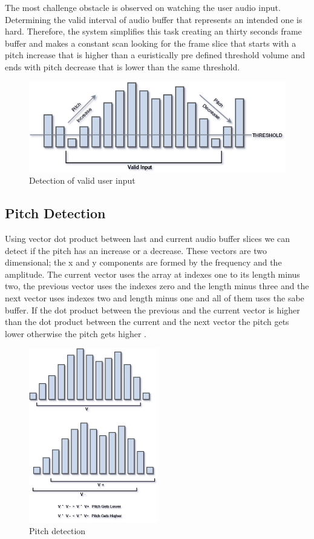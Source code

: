 \documentclass[
	article,			%
	11pt,				%
	oneside,			%
	a4paper,			%
	english,			%
	english,				%
	]{abntex2}
\begin{document}
The most challenge obstacle is observed on watching the user audio input. Determining the valid interval
of audio buffer that represents an intended one is hard. Therefore, the system simplifies this task
creating an thirty seconds frame buffer and makes a constant scan looking for the frame slice that
starts with a pitch increase that is higher than a euristically pre defined threshold volume and ends
with pitch decrease that is lower than the same threshold.

\begin{figure}[H]
    \caption[english]{Detection of valid user input}
    \centering
    \includegraphics[width=\textwidth]{AudioBufferFrameSlice}
\end{figure}

\subsection{Pitch Detection}

Using vector dot product between last and current audio buffer slices we can detect if the pitch has
an increase or a decrease. These vectors are two dimensional; the x and y components are formed by
the frequency and the amplitude. The current vector uses the array at indexes one to its length
minus two, the previous vector uses the indexes zero and the length minus three and the next vector 
uses indexes two and length minus one and all of them uses the sabe buffer. If the dot product between 
the previous and the current vector is higher than the dot product between the current and the next
vector the pitch gets lower otherwise the pitch gets higher \cite{nonverbalvoiceinput}.

\begin{figure}[H]
    \caption[english]{Pitch detection}
    \centering
    \includegraphics[width=0.5\textwidth]{PitchDetection}
\end{figure}
\end{document}
